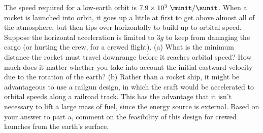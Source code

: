  The speed required for a low-earth orbit is 
$7.9\times10^3\ \munit/\sunit$. When a rocket is launched into orbit, it
goes up a little at first to get above almost all of the
atmosphere, but then tips over horizontally to build up to
orbital speed. Suppose the horizontal acceleration is
limited to $3g$ to keep from damaging the cargo (or hurting
the crew, for a crewed flight). (a) What is the minimum
distance the rocket must travel downrange before it reaches
orbital speed? How much does it matter whether you take into
account the initial eastward velocity due to the rotation of
the earth? (b) Rather than a rocket ship, it might be
advantageous to use a railgun design, in which the craft
would be accelerated to orbital speeds along a railroad
track. This has the advantage that it isn't necessary to
lift a large mass of fuel, since the energy source is
external. Based on your answer to part a, comment on the
feasibility of this design for crewed launches from
the earth's surface.
